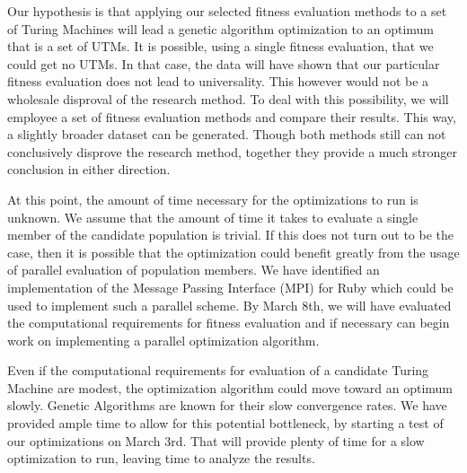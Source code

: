 Our hypothesis is that applying our selected fitness evaluation methods to a set of Turing Machines will lead a genetic algorithm optimization to an optimum that is a set of UTMs. It is possible, using a single fitness evaluation, that we could get no UTMs. In that case, the data will have shown that our particular fitness evaluation does not lead to universality. This however would not be a wholesale disproval of the research method. To deal with this possibility, we will employee a set of fitness evaluation methods and compare their results. This way, a slightly broader dataset can be generated. Though both methods still can not conclusively disprove the research method, together they provide a much stronger conclusion in either direction. 
    
At this point, the amount of time necessary for the optimizations to run is unknown. We assume that the amount of time it takes to evaluate a single member of the candidate population is trivial. If this does not turn out to be the case, then it is possible that the optimization could benefit greatly from the usage of parallel evaluation of population members. We have identified an implementation of the Message Passing Interface (MPI) for Ruby which could be used to implement such a parallel scheme. By March 8th, we will have evaluated the computational requirements for fitness evaluation and if necessary can begin work on implementing a parallel optimization algorithm.

Even if the computational requirements for evaluation of a candidate Turing Machine are modest, the optimization algorithm could move toward an optimum slowly. Genetic Algorithms are known for their slow convergence rates. We have provided ample time to allow for this potential bottleneck, by starting a test of our optimizations on March 3rd. That will provide plenty of time for a slow optimization to run, leaving time to analyze the results. 

